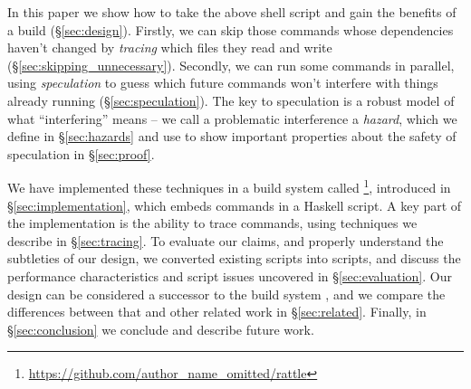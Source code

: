 In this paper we show how to take the above shell script and gain the benefits of a \Make build (\S\ref{sec:design}). Firstly, we can skip those commands whose dependencies haven't changed by \emph{tracing} which files they read and write (\S\ref{sec:skipping_unnecessary}). Secondly, we can run some commands in parallel, using \emph{speculation} to guess which future commands won't interfere with things already running (\S\ref{sec:speculation}). The key to speculation is a robust model of what ``interfering'' means -- we call a problematic interference a \emph{hazard}, which we define in \S\ref{sec:hazards} and use to show important properties about the safety of speculation in \S\ref{sec:proof}.

We have implemented these techniques in a build system called \Rattle\footnote{\url{https://github.com/author_name_omitted/rattle}}, introduced in \S\ref{sec:implementation}, which embeds commands in a Haskell script. A key part of the implementation is the ability to trace commands, using techniques we describe in \S\ref{sec:tracing}. To evaluate our claims, and properly understand the subtleties of our design, we converted existing \Make scripts into \Rattle scripts, and discuss the performance characteristics and \Make script issues uncovered in \S\ref{sec:evaluation}. Our design can be considered a successor to the \Memoize build system \cite{memoize}, and we compare the differences between that and other related work in \S\ref{sec:related}. Finally, in \S\ref{sec:conclusion} we conclude and describe future work.
